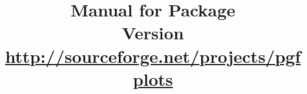 %
%
%
% 
% 
%
%



\def\plotcoords{%
\addplot coordinates {
(5,8.312e-02)    (17,2.547e-02)   (49,7.407e-03)
(129,2.102e-03)  (321,5.874e-04)  (769,1.623e-04)
(1793,4.442e-05) (4097,1.207e-05) (9217,3.261e-06)
};

\addplot coordinates{
(7,8.472e-02)    (31,3.044e-02)    (111,1.022e-02)
(351,3.303e-03)  (1023,1.039e-03)  (2815,3.196e-04)
(7423,9.658e-05) (18943,2.873e-05) (47103,8.437e-06)
};

\addplot coordinates{
(9,7.881e-02)     (49,3.243e-02)    (209,1.232e-02)
(769,4.454e-03)   (2561,1.551e-03)  (7937,5.236e-04)
(23297,1.723e-04) (65537,5.545e-05) (178177,1.751e-05)
};

\addplot coordinates{
(11,6.887e-02)    (71,3.177e-02)     (351,1.341e-02)
(1471,5.334e-03)  (5503,2.027e-03)   (18943,7.415e-04)
(61183,2.628e-04) (187903,9.063e-05) (553983,3.053e-05)
};

\addplot coordinates{
(13,5.755e-02)     (97,2.925e-02)     (545,1.351e-02)
(2561,5.842e-03)   (10625,2.397e-03)  (40193,9.414e-04)
(141569,3.564e-04) (471041,1.308e-04) 
(1496065,4.670e-05)
};
}%

\title{%
	Manual for Package \PGFPlots\\
	{\small Version \pgfplotsversion}\\
	{\small\href{http://sourceforge.net/projects/pgfplots}{http://sourceforge.net/projects/pgfplots}}}

%



